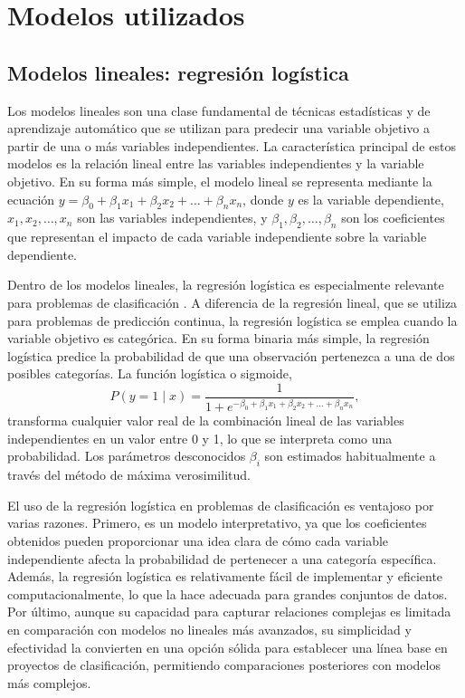 
\section{Modelos utilizados}
\label{sec:models}

\subsection{Modelos lineales: regresión logística}
\label{subsec:model-linear}

Los modelos lineales son una clase fundamental de técnicas estadísticas y de aprendizaje automático que se utilizan para predecir una variable objetivo a partir de una o más variables independientes. La característica principal de estos modelos es la relación lineal entre las variables independientes y la variable objetivo. En su forma más simple, el modelo lineal se representa mediante la ecuación $y = \beta_0 + \beta_1 x_1 + \beta_2 x_2 + \dots + \beta_n x_n$, donde $y$ es la variable dependiente, $x_1, x_2, \dots, x_n$ son las variables independientes, y $\beta_1, \beta_2, \dots, \beta_n$ son los coeficientes que representan el impacto de cada variable independiente sobre la variable dependiente.

Dentro de los modelos lineales, la regresión logística es especialmente relevante para problemas de clasificación \cite{geron2022hands}. A diferencia de la regresión lineal, que se utiliza para problemas de predicción continua, la regresión logística se emplea cuando la variable objetivo es categórica. En su forma binaria más simple, la regresión logística predice la probabilidad de que una observación pertenezca a una de dos posibles categorías. La función logística o sigmoide, 
\begin{equation*}
    P(y=1\mid x) = \frac{1}{1+e^{-\beta_0 + \beta_1 x_1 + \beta_2 x_2 + \dots + \beta_n x_n}},
\end{equation*}
transforma cualquier valor real de la combinación lineal de las variables independientes en un valor entre 0 y 1, lo que se interpreta como una probabilidad. Los parámetros desconocidos $\beta_i$ son estimados habitualmente a través del método de máxima verosimilitud.

El uso de la regresión logística en problemas de clasificación es ventajoso por varias razones. Primero, es un modelo interpretativo, ya que los coeficientes obtenidos pueden proporcionar una idea clara de cómo cada variable independiente afecta la probabilidad de pertenecer a una categoría específica. Además, la regresión logística es relativamente fácil de implementar y eficiente computacionalmente, lo que la hace adecuada para grandes conjuntos de datos. Por último, aunque su capacidad para capturar relaciones complejas es limitada en comparación con modelos no lineales más avanzados, su simplicidad y efectividad la convierten en una opción sólida para establecer una línea base en proyectos de clasificación, permitiendo comparaciones posteriores con modelos más complejos.

